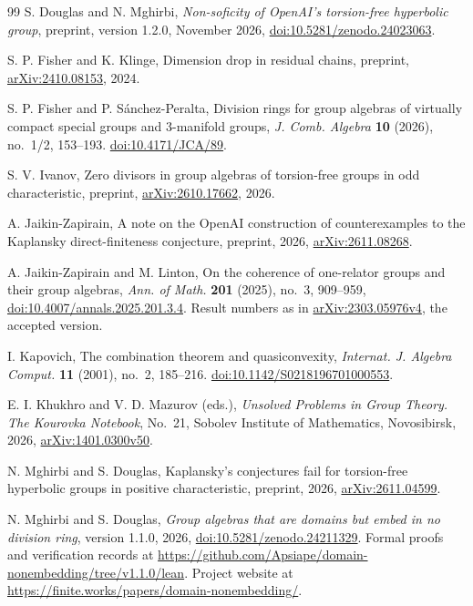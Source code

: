 \documentclass[11pt,a4paper]{article}
\numberwithin{equation}{section}
\begin{document}
\begin{thebibliography}{99}
S. Douglas and N. Mghirbi, \emph{Non-soficity of OpenAI's torsion-free
hyperbolic group}, preprint, version 1.2.0, November 2026,
\href{https://doi.org/10.5281/zenodo.24023063}{doi:10.5281/zenodo.24023063}.

S. P. Fisher and K. Klinge, Dimension drop in residual chains, preprint,
\href{https://arxiv.org/abs/2410.08153}{arXiv:2410.08153}, 2024.

S. P. Fisher and P. S\'anchez-Peralta, Division rings for group algebras of
virtually compact special groups and 3-manifold groups, \emph{J. Comb. Algebra}
\textbf{10} (2026), no.~1/2, 153--193.
\href{https://doi.org/10.4171/JCA/89}{doi:10.4171/JCA/89}.

S. V. Ivanov, Zero divisors in group algebras of torsion-free groups in odd
characteristic, preprint,
\href{https://arxiv.org/abs/2610.17662}{arXiv:2610.17662}, 2026.

A. Jaikin-Zapirain, A note on the OpenAI construction of counterexamples to the
Kaplansky direct-finiteness conjecture, preprint, 2026,
\href{https://arxiv.org/abs/2611.08268}{arXiv:2611.08268}.

A. Jaikin-Zapirain and M. Linton, On the coherence of one-relator groups and
their group algebras, \emph{Ann. of Math.} \textbf{201} (2025), no.~3,
909--959, \href{https://doi.org/10.4007/annals.2025.201.3.4}{doi:10.4007/annals.2025.201.3.4}.
Result numbers as in
\href{https://arxiv.org/abs/2303.05976v4}{arXiv:2303.05976v4}, the accepted version.

I. Kapovich, The combination theorem and quasiconvexity,
\emph{Internat. J. Algebra Comput.} \textbf{11} (2001), no.~2, 185--216.
\href{https://doi.org/10.1142/S0218196701000553}{doi:10.1142/S0218196701000553}.

E. I. Khukhro and V. D. Mazurov (eds.), \emph{Unsolved Problems in Group
Theory. The Kourovka Notebook}, No.~21, Sobolev Institute of Mathematics,
Novosibirsk, 2026,
\href{https://arxiv.org/abs/1401.0300v50}{arXiv:1401.0300v50}.

N. Mghirbi and S. Douglas, Kaplansky's conjectures fail for torsion-free
hyperbolic groups in positive characteristic, preprint, 2026,
\href{https://arxiv.org/abs/2611.04599}{arXiv:2611.04599}.

N. Mghirbi and S. Douglas, \emph{Group algebras that are domains but embed in
no division ring}, version 1.1.0, 2026,
\href{https://doi.org/10.5281/zenodo.24211329}{doi:10.5281/zenodo.24211329}.
Formal proofs and verification records at
\url{https://github.com/Apsiape/domain-nonembedding/tree/v1.1.0/lean}.
Project website at \url{https://finite.works/papers/domain-nonembedding/}.


\end{thebibliography}
\end{document}
